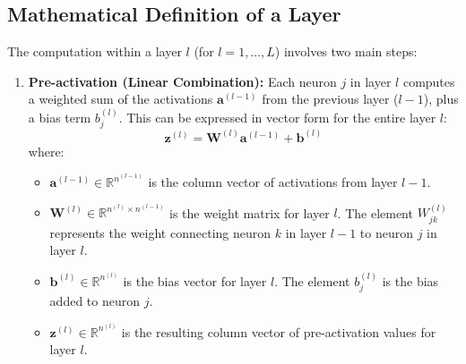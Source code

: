 \documentclass[11pt,twoside,openright]{report}
\begin{document}
\subsection{Mathematical Definition of a Layer}
The computation within a layer $l$ (for $l=1, \dots, L$) involves two main steps:

\begin{enumerate}
    \item \textbf{Pre-activation (Linear Combination):} Each neuron $j$ in layer $l$ computes a weighted sum of the activations $\mathbf{a}^{(l-1)}$ from the previous layer ($l-1$), plus a bias term $b_j^{(l)}$. This can be expressed in vector form for the entire layer $l$:
        \begin{equation} \label{eq:preactivation}
            \mathbf{z}^{(l)} = \mathbf{W}^{(l)} \mathbf{a}^{(l-1)} + \mathbf{b}^{(l)}
        \end{equation}
        where:
        \begin{itemize}
            \item $\mathbf{a}^{(l-1)} \in \mathbb{R}^{n^{(l-1)}}$ is the column vector of activations from layer $l-1$.
            \item $\mathbf{W}^{(l)} \in \mathbb{R}^{n^{(l)} \times n^{(l-1)}}$ is the weight matrix for layer $l$. The element $W_{jk}^{(l)}$ represents the weight connecting neuron $k$ in layer $l-1$ to neuron $j$ in layer $l$.
            \item $\mathbf{b}^{(l)} \in \mathbb{R}^{n^{(l)}}$ is the bias vector for layer $l$. The element $b_j^{(l)}$ is the bias added to neuron $j$.
            \item $\mathbf{z}^{(l)} \in \mathbb{R}^{n^{(l)}}$ is the resulting column vector of pre-activation values for layer $l$.
        \end{itemize}


\end{enumerate}
\end{document}
